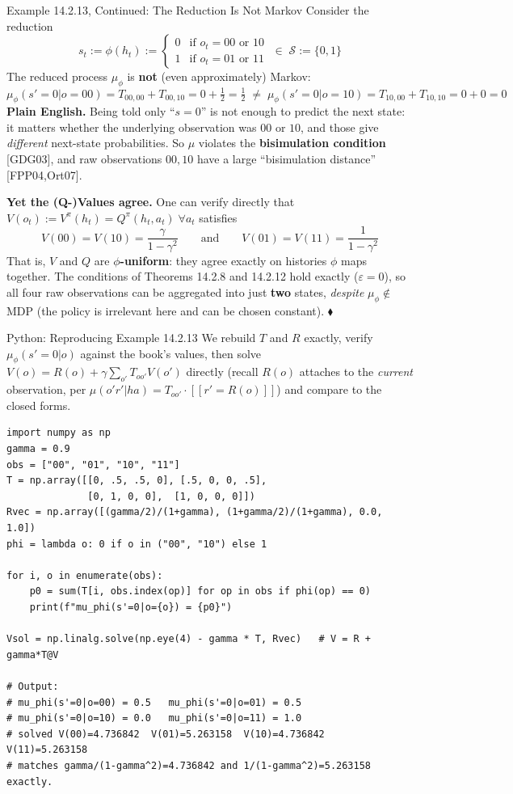 \documentclass[aspectratio=169,10pt]{beamer}
\newcommand{\Sc}{\mathcal{S}}
\begin{document}
\begin{frame}{Example 14.2.13, Continued: The Reduction Is Not Markov}
  Consider the reduction
  \[
    s_t := \phi(h_t) := \begin{cases}0 & \text{if } o_t=00\text{ or }10\\ 1 & \text{if } o_t=01\text{ or }11\end{cases}
    \;\in\; \Sc:=\{0,1\}
  \]
  The reduced process $\mu_\phi$ is \textbf{not} (even approximately)
  Markov:
  \[
    \mu_\phi(s'=0|o=00) = T_{00,00}+T_{00,10} = 0+\tfrac12 = \tfrac12
    \;\neq\;
    \mu_\phi(s'=0|o=10) = T_{10,00}+T_{10,10} = 0+0 = 0
  \]
  \textbf{Plain English.} Being told only ``$s=0$'' is not enough to
  predict the next state: it matters whether the underlying observation
  was $00$ or $10$, and those give \emph{different} next-state
  probabilities. So $\mu$ violates the \textbf{bisimulation condition}
  [GDG03], and raw observations $00,10$ have a large ``bisimulation
  distance'' [FPP04,Ort07].

  \vspace{0.4em}
  \textbf{Yet the (Q-)Values agree.} One can verify directly that
  $V(o_t):=V^\pi(h_t)=Q^\pi(h_t,a_t)\;\forall a_t$ satisfies
  \[
    V(00)=V(10)=\frac{\gamma}{1-\gamma^2} \qquad\text{and}\qquad V(01)=V(11)=\frac{1}{1-\gamma^2}
  \]
  That is, $V$ and $Q$ are \textbf{$\phi$-uniform}: they agree exactly on
  histories $\phi$ maps together. The conditions of Theorems 14.2.8 and
  14.2.12 hold exactly ($\varepsilon=0$), so all four raw observations can
  be aggregated into just \textbf{two} states, \emph{despite}
  $\mu_\phi\notin$ MDP (the policy is irrelevant here and can be chosen
  constant). $\blacklozenge$
\end{frame}

\begin{frame}[fragile]{Python: Reproducing Example 14.2.13}
  We rebuild $T$ and $R$ exactly, verify $\mu_\phi(s'=0|o)$ against the
  book's values, then solve $V(o)=R(o)+\gamma\sum_{o'}T_{oo'}V(o')$
  directly (recall $R(o)$ attaches to the \emph{current} observation, per
  $\mu(o'r'|ha)=T_{oo'}\cdot[\![r'=R(o)]\!]$) and compare to the closed
  forms.
  \begin{lstlisting}[style=pycode]
import numpy as np
gamma = 0.9
obs = ["00", "01", "10", "11"]
T = np.array([[0, .5, .5, 0], [.5, 0, 0, .5],
              [0, 1, 0, 0],  [1, 0, 0, 0]])
Rvec = np.array([(gamma/2)/(1+gamma), (1+gamma/2)/(1+gamma), 0.0, 1.0])
phi = lambda o: 0 if o in ("00", "10") else 1

for i, o in enumerate(obs):
    p0 = sum(T[i, obs.index(op)] for op in obs if phi(op) == 0)
    print(f"mu_phi(s'=0|o={o}) = {p0}")

Vsol = np.linalg.solve(np.eye(4) - gamma * T, Rvec)   # V = R + gamma*T@V

# Output:
# mu_phi(s'=0|o=00) = 0.5   mu_phi(s'=0|o=01) = 0.5
# mu_phi(s'=0|o=10) = 0.0   mu_phi(s'=0|o=11) = 1.0
# solved V(00)=4.736842  V(01)=5.263158  V(10)=4.736842  V(11)=5.263158
# matches gamma/(1-gamma^2)=4.736842 and 1/(1-gamma^2)=5.263158 exactly.
  \end{lstlisting}
\end{frame}
\end{document}
